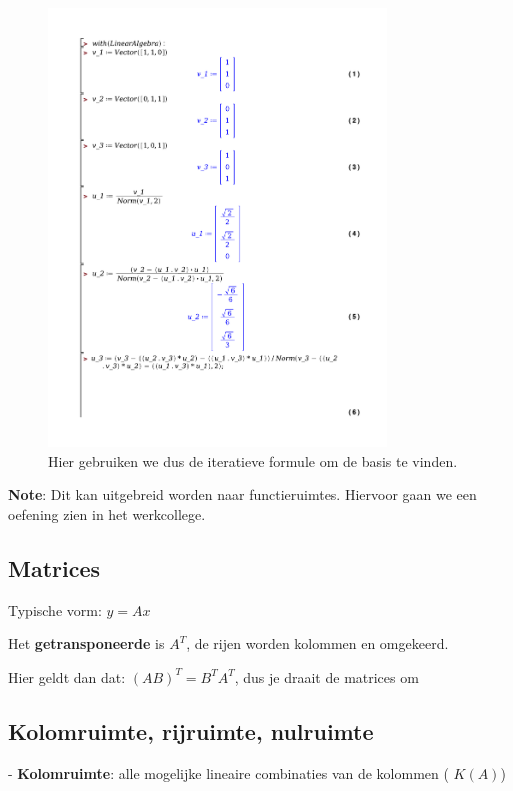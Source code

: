 \documentclass[a4paper]{report}
\begin{document}
\begin{figure}[H]
	\centering
	\includegraphics[width=0.8\textwidth]{./gram.pdf}
	\caption{Hier gebruiken we dus de iteratieve formule om de basis te vinden.}
	\label{fig:gramm_schmidt}
\end{figure}

\textbf{Note}: Dit kan uitgebreid worden naar functieruimtes. Hiervoor gaan we een oefening zien in het werkcollege.

\subsection{Matrices}

Typische vorm: $y=Ax$

Het \textbf{getransponeerde} is $A^T$, de rijen worden kolommen en omgekeerd.

Hier geldt dan dat: $(AB)^T = B^T A^T$, dus je draait de matrices om

\subsection{Kolomruimte, rijruimte, nulruimte}

- \textbf{Kolomruimte}: alle mogelijke lineaire combinaties van de kolommen ( $K(A)$)
\end{document}
